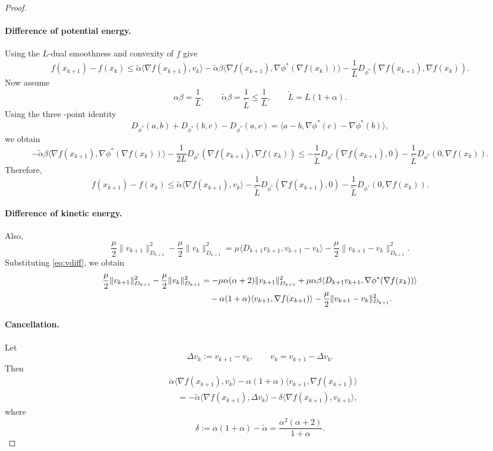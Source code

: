 \documentclass{article}
\theoremstyle{plain}
\theoremstyle{remark}
\begin{document}
\begin{proof}
\paragraph{Difference of potential energy.}
Using the $L$-dual smoothness and convexity of $f$ give
\[
f(x_{k+1}) - f(x_k)
\le \tilde{\alpha}\langle\nabla f(x_{k+1}), v_k\rangle
- \tilde{\alpha}\beta\langle\nabla f(x_{k+1}), \nabla \phi^*(\nabla f(x_k))\rangle
- \frac{1}{L}D_{\phi^*}(\nabla f(x_{k+1}), \nabla f(x_k)).
\]
Now assume
\[
\alpha\beta = \frac{1}{L}, \qquad
\tilde{\alpha}\beta = \frac{1}{\tilde{L}} \le \frac{1}{L}, \qquad
\tilde{L} = L(1+\alpha).
\]
Using the three -point identity
\[
D_{\phi^*}(a,b) + D_{\phi^*}(b,c) - D_{\phi^*}(a,c) = \langle a-b, \nabla \phi^*(c) - \nabla \phi^*(b)\rangle,
\]
we obtain
\[
-\tilde{\alpha}\beta\langle\nabla f(x_{k+1}),\nabla \phi^*(\nabla f(x_k))\rangle
- \frac{1}{2L}D_{\phi^*}(\nabla f(x_{k+1}), \nabla f(x_k))
\le -\frac{1}{\tilde{L}}D_{\phi^*}(\nabla f(x_{k+1}), 0) - \frac{1}{\tilde{L}}D_{\phi^*}(0, \nabla f(x_k)).
\]
Therefore,
\begin{equation}\label{eq:fdiff}
f(x_{k+1}) - f(x_k)
\le \tilde{\alpha}\langle\nabla f(x_{k+1}), v_k\rangle
- \frac{1}{\tilde{L}}D_{\phi^*}(\nabla f(x_{k+1}), 0) - \frac{1}{\tilde{L}}D_{\phi^*}(0, \nabla f(x_k)).
\end{equation}

\paragraph{Difference of kinetic energy.} Also,
\[
\frac{\mu}{2}\|v_{k+1}\|_{D_{k+1}}^2 - \frac{\mu}{2}\|v_k\|_{D_{k+1}}^2
= \mu\langle D_{k+1}v_{k+1}, v_{k+1}-v_k\rangle - \frac{\mu}{2}\|v_{k+1}-v_k\|_{D_{k+1}}^2.
\]
Substituting \eqref{eq:vdiff},
we obtain
\begin{align}
\frac{\mu}{2}\|v_{k+1}\|_{D_{k+1}}^2 - \frac{\mu}{2}\|v_k\|_{D_{k+1}}^2
&= -\mu\alpha(\alpha+2)\|v_{k+1}\|_{D_{k+1}}^2
+ \mu\alpha\beta\langle D_{k+1}v_{k+1},\nabla \phi^*(\nabla f(x_k))\rangle \notag\\
&\quad - \alpha(1+\alpha)\langle v_{k+1},\nabla f(x_{k+1})\rangle
- \frac{\mu}{2}\|v_{k+1}-v_k\|_{D_{k+1}}^2. \label{eq:vdiff2}
\end{align}

\paragraph{Cancellation.} Let
\[
\Delta v_k := v_{k+1} - v_k, \qquad v_k = v_{k+1} - \Delta v_k.
\]
Then
\begin{align*}
&\tilde{\alpha}\langle\nabla f(x_{k+1}), v_k\rangle
- \alpha(1+\alpha)\langle v_{k+1}, \nabla f(x_{k+1})\rangle\\
&\quad = -\tilde{\alpha}\langle\nabla f(x_{k+1}), \Delta v_k\rangle
- \delta\langle\nabla f(x_{k+1}), v_{k+1}\rangle,
\end{align*}
where
\[
\delta := \alpha(1+\alpha) - \tilde{\alpha} = \frac{\alpha^2(\alpha+2)}{1+\alpha}.
\]


\end{proof}
\end{document}
